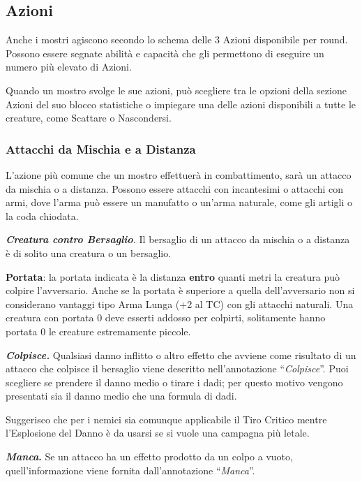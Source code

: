 \begin{multicols}{2}
	\subsection{Azioni}

	Anche i mostri agiscono secondo lo schema delle 3 Azioni disponibile per round. Possono essere segnate abilità e capacità che gli permettono di eseguire un numero più elevato di Azioni.

	Quando un mostro svolge le sue azioni, può scegliere tra le opzioni della sezione Azioni del suo blocco statistiche o impiegare una delle azioni disponibili a tutte le creature, come Scattare o Nascondersi.

	\subsubsection{Attacchi da Mischia e a Distanza}

	L'azione più comune che un mostro effettuerà in combattimento, sarà un attacco da mischia o a distanza. Possono essere attacchi con incantesimi o attacchi con armi, dove l'arma può essere un manufatto o un'arma naturale, come gli artigli o la coda chiodata.

	\textit{\textbf{Creatura contro Bersaglio}.} Il bersaglio di un attacco da mischia o a distanza è di solito una creatura o un bersaglio.

	\textbf{Portata}: la portata indicata è la distanza \textbf{entro} quanti metri la creatura può colpire l'avversario. Anche se la portata è superiore a quella dell'avversario non si considerano vantaggi tipo Arma Lunga (+2 al TC) con gli attacchi naturali. Una creatura con portata 0 deve esserti addosso per colpirti, solitamente hanno portata 0 le creature estremamente piccole.

	\textit{\textbf{Colpisce.}} Qualsiasi danno inflitto o altro effetto che avviene come risultato di un attacco che colpisce il bersaglio viene descritto nell'annotazione ``\textit{Colpisce}''. Puoi scegliere se prendere il danno medio o tirare i dadi; per questo motivo vengono presentati sia il danno medio che una formula di dadi.

	Suggerisco che per i nemici sia comunque applicabile il Tiro Critico mentre l'Esplosione del Danno è da usarsi se si vuole una campagna più letale.

	\textbf{\textit{Manca}.} Se un attacco ha un effetto prodotto da un colpo a vuoto, quell'informazione viene fornita dall'annotazione ``\textit{Manca}''.


\end{multicols}
